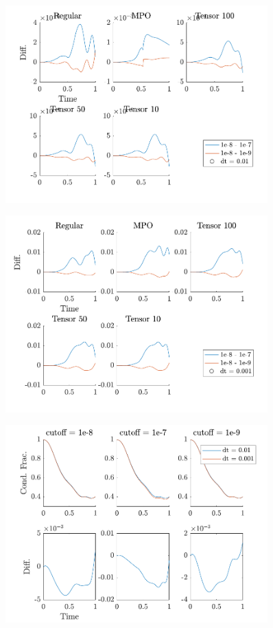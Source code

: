 \begin{figure}[h]
	\centering
	\includegraphics[width=0.9\textwidth]{Figures/CompareCutoffs1.pdf}
	\caption{\textit{}}
	\label{fig:Cutoff1}
\end{figure}

\begin{figure}[h]
	\centering
	\includegraphics[width=0.9\textwidth]{Figures/CompareCutoffs2.pdf}
	\caption{\textit{}}
	\label{fig:Cutoff2}
\end{figure}

\begin{figure}[h]
	\centering
	\includegraphics[width=0.9\textwidth]{Figures/CompareTimeStep.pdf}
	\caption{\textit{}}
	\label{fig:TimeStep}
\end{figure}


